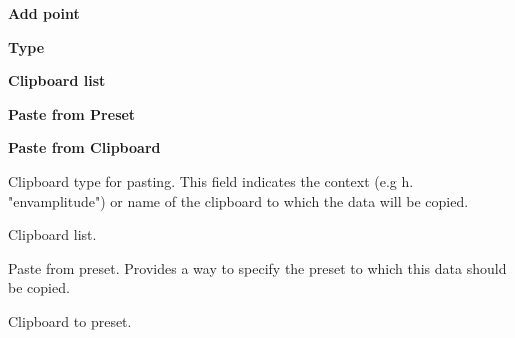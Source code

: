    \begin{enumber}
      \item \textbf{Add point}
      \item \textbf{Type}
      \item \textbf{Clipboard list}
      \item \textbf{Paste from Preset}
      \item \textbf{Paste from Clipboard}
   \end{enumber}

   \setcounter{ItemCounter}{0}      %

   Clipboard type for pasting.  
   This field indicates the context (e.g h. "envamplitude") or name of the
   clipboard to which the data will be copied.

   Clipboard list.

   Paste from preset.
   Provides a way to specify the preset to which this data should be
   copied.

   Clipboard to preset.

